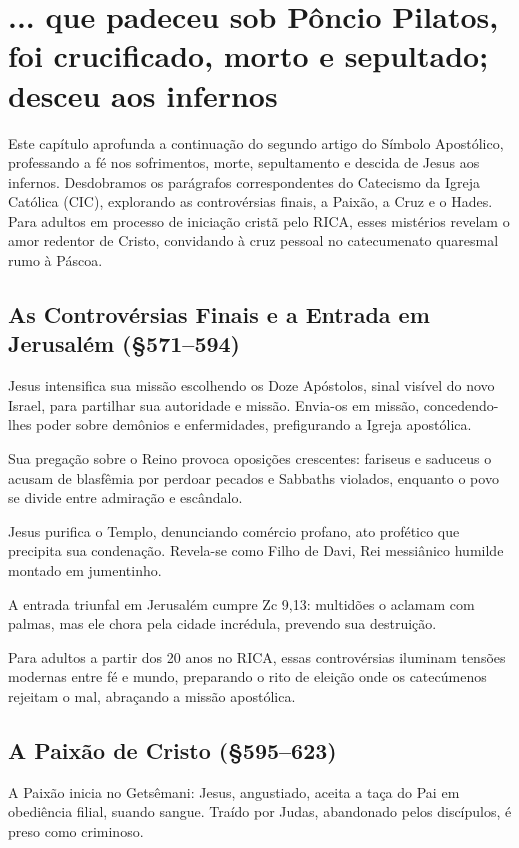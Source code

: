 \chapter{... que padeceu sob Pôncio Pilatos, foi crucificado, morto e sepultado; desceu aos infernos}

Este capítulo aprofunda a continuação do segundo artigo do Símbolo Apostólico, professando a fé nos sofrimentos, morte, sepultamento e descida de Jesus aos infernos. Desdobramos os parágrafos correspondentes do Catecismo da Igreja Católica (CIC), explorando as controvérsias finais, a Paixão, a Cruz e o Hades. Para adultos em processo de iniciação cristã pelo RICA, esses mistérios revelam o amor redentor de Cristo, convidando à cruz pessoal no catecumenato quaresmal rumo à Páscoa.

\section{As Controvérsias Finais e a Entrada em Jerusalém (\S 571--594)}

Jesus intensifica sua missão escolhendo os Doze Apóstolos, sinal visível do novo Israel, para partilhar sua autoridade e missão. Envia-os em missão, concedendo-lhes poder sobre demônios e enfermidades, prefigurando a Igreja apostólica.

Sua pregação sobre o Reino provoca oposições crescentes: fariseus e saduceus o acusam de blasfêmia por perdoar pecados e Sabbaths violados, enquanto o povo se divide entre admiração e escândalo.

Jesus purifica o Templo, denunciando comércio profano, ato profético que precipita sua condenação. Revela-se como Filho de Davi, Rei messiânico humilde montado em jumentinho.

A entrada triunfal em Jerusalém cumpre Zc 9,13: multidões o aclamam com palmas, mas ele chora pela cidade incrédula, prevendo sua destruição.

Para adultos a partir dos 20 anos no RICA, essas controvérsias iluminam tensões modernas entre fé e mundo, preparando o rito de eleição onde os catecúmenos rejeitam o mal, abraçando a missão apostólica.

\section{A Paixão de Cristo (\S 595--623)}

A Paixão inicia no Getsêmani: Jesus, angustiado, aceita a taça do Pai em obediência filial, suando sangue. Traído por Judas, abandonado pelos discípulos, é preso como criminoso.

